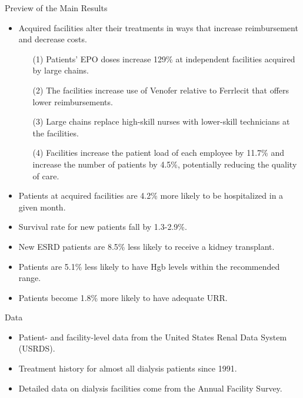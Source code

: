 \documentclass[aspectratio=169]{beamer}
\begin{document}
\begin{frame}{Preview of the Main Results}

\begin{itemize}
\item Acquired facilities alter their treatments in ways that increase reimbursement and decrease costs.
    \begin{itemize}
        \item [(1)] Patients' EPO doses increase 129\% at independent facilities acquired by large chains.
        \item [(2)] The facilities increase use of Venofer relative to Ferrlecit that offers lower reimbursements.
        \item [(3)] Large chains replace high-skill nurses with lower-skill technicians at the facilities.
        \item [(4)] Facilities increase the patient load of each employee by 11.7\% and increase the number of patients by 4.5\%, potentially reducing the quality of care.
    \end{itemize}
\item Patients at acquired facilities are 4.2\% more likely to be hospitalized in a given month.
\item Survival rate for new patients fall by 1.3-2.9\%.
\item New ESRD patients are 8.5\% less likely to receive a kidney transplant.
\item Patients are 5.1\% less likely to have Hgb levels within the recommended range.
\item Patients become 1.8\% more likely to have adequate URR.
\end{itemize}

\end{frame}

\begin{frame}{Data}
\begin{itemize}
\item Patient- and facility-level data from the United States Renal Data System (USRDS).
\item Treatment history for almost all dialysis patients since 1991.
\item Detailed data on dialysis facilities come from the Annual Facility Survey.
\end{itemize}

\end{frame}
\end{document}
